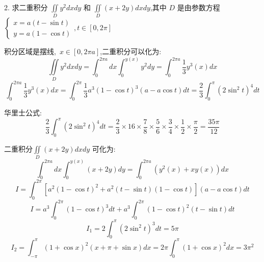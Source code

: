 2. 求二重积分 $\iint\limits_{D}y^2dxdy$ 和 $\iint\limits_{D}(x+2y)dxdy$,其中 $D$ 是由参数方程 $\left\lbrace\begin{array}{l}
	x=a(t-\sin t)\\y=a(1-\cos t)
\end{array} \right. ,t\in [0,2\pi]$
\begin{solution}
	
	积分区域是摆线,\ $x\in [0,2\pi a]$,二重积分可以化为: 
	$$\iint\limits_{D}y^2dxdy=\int_{0}^{2\pi a}dx\int_{0}^{y(x)}y^2dy=\int_{0}^{2\pi a}\frac{1}{3}y^{3}(x)dx$$
	$$\int_{0}^{2\pi a}\frac{1}{3}y^{3}(x)dx=\int_{0}^{2\pi }\frac{1}{3}a^3(1-\cos t)^3(a-a\cos t)dt=\frac{2}{3}\int_{0}^{\pi}(2\sin^2 t)^4dt$$
	
	华里士公式:  $$\frac{2}{3}\int_{0}^{\pi}(2\sin^2 t)^4dt=\frac{2}{3}\times 16\times\frac{7}{8}\times\frac{5}{6}\times\frac{3}{4}\times\frac{1}{2}\times\frac{\pi}{2}=\frac{35\pi}{12}$$
	
	二重积分$\iint\limits_{D}(x+2y)dxdy$ 可化为: 
	$$\int_{0}^{2\pi a}dx\int_{0}^{y(x)}(x+2y)dy=\int_{0}^{2\pi a}(y^{2}(x)+xy(x))dx$$
	$$I=\int_{0}^{2\pi }[a^2(1-\cos t)^2+a^2(t-\sin t)(1-\cos t)](a-a\cos t)dt$$
	$$I=a^3\int_{0}^{2\pi }(1-\cos t)^3dt+a^3\int_{0}^{2\pi }(1-\cos t)^2(t-\sin t)dt$$
	$$I_{1}=2\int_{0}^{\pi}(2\sin^2 t)^3dt=5\pi$$
	$$I_{2}=\int_{-\pi}^{\pi}(1+\cos x)^2(x+\pi+\sin x)dx=2\pi\int_{0}^{\pi}(1+\cos x)^2dx=3\pi^2$$
\end{solution}

